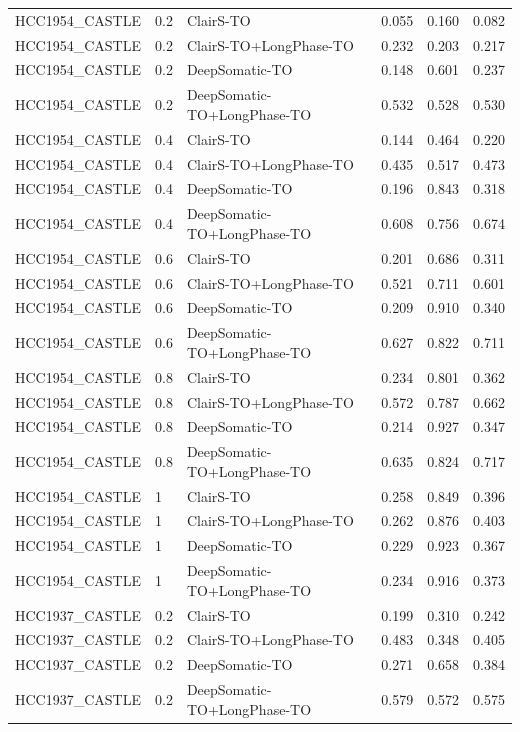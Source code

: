 \documentclass[pdflatex,sn-nature]{sn-jnl}
\begin{document}
{\begin{longtable}{@{}lllccc@{}}
  \addlinespace
  HCC1954\_CASTLE & 0.2 & ClairS-TO & 0.055 & 0.160 & 0.082 \\
  HCC1954\_CASTLE & 0.2 & ClairS-TO+LongPhase-TO & 0.232 & 0.203 & 0.217 \\
  HCC1954\_CASTLE & 0.2 & DeepSomatic-TO & 0.148 & 0.601 & 0.237 \\
  HCC1954\_CASTLE & 0.2 & DeepSomatic-TO+LongPhase-TO & 0.532 & 0.528 & 0.530 \\
  HCC1954\_CASTLE & 0.4 & ClairS-TO & 0.144 & 0.464 & 0.220 \\
  HCC1954\_CASTLE & 0.4 & ClairS-TO+LongPhase-TO & 0.435 & 0.517 & 0.473 \\
  HCC1954\_CASTLE & 0.4 & DeepSomatic-TO & 0.196 & 0.843 & 0.318 \\
  HCC1954\_CASTLE & 0.4 & DeepSomatic-TO+LongPhase-TO & 0.608 & 0.756 & 0.674 \\
  HCC1954\_CASTLE & 0.6 & ClairS-TO & 0.201 & 0.686 & 0.311 \\
  HCC1954\_CASTLE & 0.6 & ClairS-TO+LongPhase-TO & 0.521 & 0.711 & 0.601 \\
  HCC1954\_CASTLE & 0.6 & DeepSomatic-TO & 0.209 & 0.910 & 0.340 \\
  HCC1954\_CASTLE & 0.6 & DeepSomatic-TO+LongPhase-TO & 0.627 & 0.822 & 0.711 \\
  HCC1954\_CASTLE & 0.8 & ClairS-TO & 0.234 & 0.801 & 0.362 \\
  HCC1954\_CASTLE & 0.8 & ClairS-TO+LongPhase-TO & 0.572 & 0.787 & 0.662 \\
  HCC1954\_CASTLE & 0.8 & DeepSomatic-TO & 0.214 & 0.927 & 0.347 \\
  HCC1954\_CASTLE & 0.8 & DeepSomatic-TO+LongPhase-TO & 0.635 & 0.824 & 0.717 \\
  HCC1954\_CASTLE & 1 & ClairS-TO & 0.258 & 0.849 & 0.396 \\
  HCC1954\_CASTLE & 1 & ClairS-TO+LongPhase-TO & 0.262 & 0.876 & 0.403 \\
  HCC1954\_CASTLE & 1 & DeepSomatic-TO & 0.229 & 0.923 & 0.367 \\
  HCC1954\_CASTLE & 1 & DeepSomatic-TO+LongPhase-TO & 0.234 & 0.916 & 0.373 \\
  \addlinespace
  HCC1937\_CASTLE & 0.2 & ClairS-TO & 0.199 & 0.310 & 0.242 \\
  HCC1937\_CASTLE & 0.2 & ClairS-TO+LongPhase-TO & 0.483 & 0.348 & 0.405 \\
  HCC1937\_CASTLE & 0.2 & DeepSomatic-TO & 0.271 & 0.658 & 0.384 \\
  HCC1937\_CASTLE & 0.2 & DeepSomatic-TO+LongPhase-TO & 0.579 & 0.572 & 0.575 \\

\end{longtable}}
\end{document}
